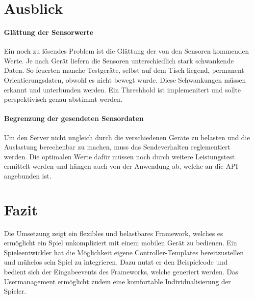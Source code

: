 \documentclass[a4paper]{spie}  %
\begin{document}
\section{Ausblick}

\paragraph{Glättung der Sensorwerte}
Ein noch zu lösendes Problem ist die Glättung der von den Sensoren kommenden Werte. Je nach Gerät liefern die Sensoren unterschiedlich stark schwankende Daten. So feuerten manche Testgeräte, selbst auf dem Tisch liegend, permanent Orientierungsdaten, obwohl es nicht bewegt wurde. Diese Schwankungen müssen erkannt und unterbunden werden. Ein Threshhold ist implemenitert und sollte perspektivisch genau abstimmt werden.

\paragraph{Begrenzung der gesendeten Sensordaten}
Um den Server nicht ungleich durch die verschiedenen Geräte zu belasten und die Auslastung berechenbar zu machen, muss das Sendeverhalten reglementiert werden. Die optimalen Werte dafür müssen noch durch weitere Leistungstest ermittelt werden und hängen auch von der Anwendung ab, welche an die API angebunden ist.


\section{Fazit}
Die Umsetzung zeigt ein flexibles und belastbares Framework, welches es ermöglicht ein Spiel unkompliziert mit einem mobilen Gerät zu bedienen.
Ein Spieleentwickler hat die Möglichkeit eigene Controller-Templates bereitzustellen und mühelos sein Spiel zu integrieren.
Dazu nutzt er den Beispielcode und bedient sich der Eingabeevents des Frameworks, welche generiert werden. Das Usermanagement ermöglicht zudem eine komfortable Individualisierung der Spieler.





\end{document}
